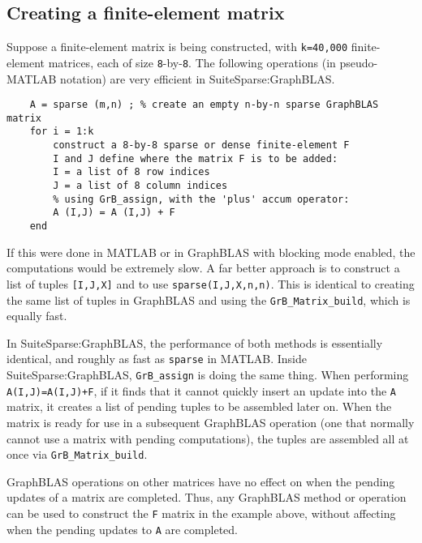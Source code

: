 \documentclass[12pt]{article}
\begin{document}
\subsection{Creating a finite-element matrix}
\label{fem}

Suppose a finite-element matrix is being constructed, with \verb'k=40,000'
finite-element matrices, each of size \verb'8'-by-\verb'8'.  The following
operations (in pseudo-MATLAB notation) are very efficient in
SuiteSparse:GraphBLAS.

    {\footnotesize
    \begin{verbatim}
    A = sparse (m,n) ; % create an empty n-by-n sparse GraphBLAS matrix
    for i = 1:k
        construct a 8-by-8 sparse or dense finite-element F
        I and J define where the matrix F is to be added:
        I = a list of 8 row indices
        J = a list of 8 column indices
        % using GrB_assign, with the 'plus' accum operator:
        A (I,J) = A (I,J) + F
    end \end{verbatim}}

If this were done in MATLAB or in GraphBLAS with blocking mode enabled, the
computations would be extremely slow.  A far better approach is to construct a
list of tuples \verb'[I,J,X]' and to use \verb'sparse(I,J,X,n,n)'. This is
identical to creating the same list of tuples in GraphBLAS and using the
\verb'GrB_Matrix_build', which is equally fast.

In SuiteSparse:GraphBLAS, the performance of both methods is essentially
identical, and roughly as fast as \verb'sparse' in MATLAB.  Inside
SuiteSparse:GraphBLAS, \verb'GrB_assign' is doing the same thing. When
performing \verb'A(I,J)=A(I,J)+F', if it finds that it cannot quickly insert an
update into the \verb'A' matrix, it creates a list of pending tuples to be
assembled later on.   When the matrix is ready for use in a subsequent
GraphBLAS operation (one that normally cannot use a matrix with pending
computations), the tuples are assembled all at once via
\verb'GrB_Matrix_build'.

GraphBLAS operations on other matrices have no effect on when the pending
updates of a matrix are completed.  Thus, any GraphBLAS method or operation can
be used to construct the \verb'F' matrix in the example above, without
affecting when the pending updates to \verb'A' are completed.
\end{document}
